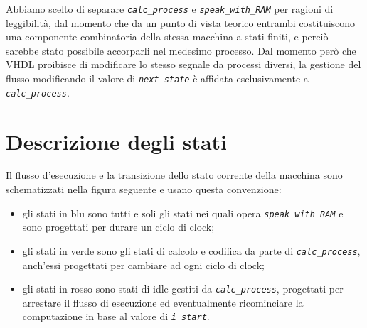 \documentclass[12pt,a4paper,titlepage]{article}
\begin{document}
		Abbiamo scelto di separare \textit{\texttt{calc\_process}} e \textit{\texttt{speak\_with\_RAM}} per ragioni di leggibilità, dal momento che da un punto di vista teorico entrambi costituiscono una componente combinatoria della stessa macchina a stati finiti, e perciò sarebbe stato possibile accorparli nel medesimo processo. Dal momento però che VHDL proibisce di modificare lo stesso segnale da processi diversi, la gestione del flusso modificando il valore di \textit{\texttt{next\_state}} è affidata esclusivamente a \textit{\texttt{calc\_process}}.

		\section{Descrizione degli stati}
		Il flusso d'esecuzione e la transizione dello stato corrente della macchina sono schematizzati nella figura seguente e usano questa convenzione:
		\begin{itemize}
		
		\item gli stati in blu sono tutti e soli gli stati nei quali opera \textit{\texttt{speak\_with\_RAM}} e sono progettati per durare un ciclo di clock;
		
		\item gli stati in verde sono gli stati di calcolo e codifica da parte di \textit{\texttt{calc\_process}}, anch'essi progettati per cambiare ad ogni ciclo di clock;
		
		\item gli stati in rosso sono stati di idle gestiti da \textit{\texttt{calc\_process}}, progettati per arrestare il flusso di esecuzione ed eventualmente ricominciare la computazione in base al valore di \textit{\texttt{i\_start}}.
		 \end{itemize}
\end{document}
